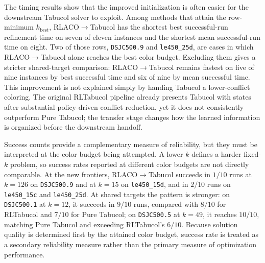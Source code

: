 \begin{table}[t]
\centering
\caption{Terminal optimization comparison. Each method reports its attained $k_{\rm best}$, the number of successful runs out of ten, and best / mean time in seconds over successful runs only. Bold $k_{\rm best}$ values are the lowest per row, including ties. Best and mean times are compared and bolded independently only among methods attaining that row-minimum color budget; times from methods reported at larger $k$ are shown for completeness but are not used for cross-method speed claims. For RLACO$\rightarrow$Tabucol, timing starts at the RLACO-to-Tabucol handoff.}
\label{tab:terminal-comparison}
\setlength{\tabcolsep}{2.1pt}
\resizebox{\textwidth}{!}{}
\end{table}

The timing results show that the improved initialization is often easier for the downstream Tabucol solver to exploit. Among methods that attain the row-minimum $k_{\mathrm{best}}$, RLACO$\rightarrow$Tabucol has the shortest best successful-run refinement time on seven of eleven instances and the shortest mean successful-run time on eight. Two of those rows, \texttt{DSJC500.9} and \texttt{le450\_25d}, are cases in which RLACO$\rightarrow$Tabucol alone reaches the best color budget. Excluding them gives a stricter shared-target comparison: RLACO$\rightarrow$Tabucol remains fastest on five of nine instances by best successful time and six of nine by mean successful time. This improvement is not explained simply by handing Tabucol a lower-conflict coloring. The original RLTabucol pipeline already presents Tabucol with states after substantial policy-driven conflict reduction, yet it does not consistently outperform Pure Tabucol; the transfer stage changes how the learned information is organized before the downstream handoff.

Success counts provide a complementary measure of reliability, but they must be interpreted at the color budget being attempted. A lower $k$ defines a harder fixed-$k$ problem, so success rates reported at different color budgets are not directly comparable. At the new frontiers, RLACO$\rightarrow$Tabucol succeeds in $1/10$ runs at $k=126$ on \texttt{DSJC500.9} and at $k=15$ on \texttt{le450\_15d}, and in $2/10$ runs on \texttt{le450\_15c} and \texttt{le450\_25d}. At shared targets the pattern is stronger: on \texttt{DSJC500.1} at $k=12$, it succeeds in $9/10$ runs, compared with $8/10$ for RLTabucol and $7/10$ for Pure Tabucol; on \texttt{DSJC500.5} at $k=49$, it reaches $10/10$, matching Pure Tabucol and exceeding RLTabucol's $6/10$. Because solution quality is determined first by the attained color budget, success rate is treated as a secondary reliability measure rather than the primary measure of optimization performance.

